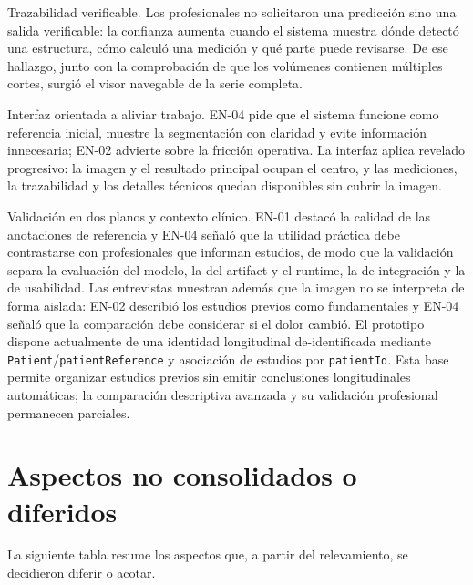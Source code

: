 Trazabilidad verificable. Los profesionales no solicitaron una predicción sino una salida verificable: la confianza aumenta cuando el sistema muestra dónde detectó una estructura, cómo calculó una medición y qué parte puede revisarse. De ese hallazgo, junto con la comprobación de que los volúmenes contienen múltiples cortes, surgió el visor navegable de la serie completa.

Interfaz orientada a aliviar trabajo. EN-04 pide que el sistema funcione como referencia inicial, muestre la segmentación con claridad y evite información innecesaria; EN-02 advierte sobre la fricción operativa. La interfaz aplica revelado progresivo: la imagen y el resultado principal ocupan el centro, y las mediciones, la trazabilidad y los detalles técnicos quedan disponibles sin cubrir la imagen.

Validación en dos planos y contexto clínico. EN-01 destacó la calidad de las anotaciones de referencia y EN-04 señaló que la utilidad práctica debe contrastarse con profesionales que informan estudios, de modo que la validación separa la evaluación del modelo, la del artifact y el runtime, la de integración y la de usabilidad. Las entrevistas muestran además que la imagen no se interpreta de forma aislada: EN-02 describió los estudios previos como fundamentales y EN-04 señaló que la comparación debe considerar si el dolor cambió. El prototipo dispone actualmente de una identidad longitudinal de-identificada mediante \texttt{Patient}/\texttt{patientReference} y asociación de estudios por \texttt{patientId}. Esta base permite organizar estudios previos sin emitir conclusiones longitudinales automáticas; la comparación descriptiva avanzada y su validación profesional permanecen parciales.

\section{Aspectos no consolidados o diferidos}

La siguiente tabla resume los aspectos que, a partir del relevamiento, se decidieron diferir o acotar.


